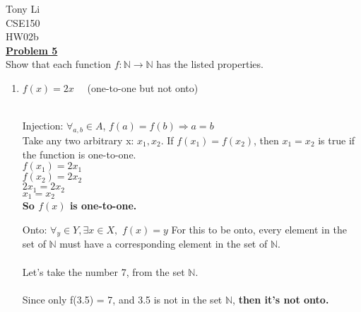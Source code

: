 \documentclass[11pt]{article}
\begin{document}
\noindent 
Tony Li \\
CSE150 \\
HW02b \\

\noindent\textbf{\underline{Problem 5}}\\
	Show that each function $f : \mathbb{N} \rightarrow \mathbb{N}$ has the listed properties.
	
	\begin{enumerate}

		\item $f(x) = 2x$ \,\,\,\,\,\,(one-to-one but not onto) \\\\
			\begin{minipage}{0.5\textwidth}
				Injection: $\forall_{a,b} \in A$, $f(a) = f(b) \Rightarrow a = b$ \\
				Take any two arbitrary x: $x_1, x_2$.
				If $f(x_1) = f(x_2)$, then $x_1 = x_2$ is true if the function is one-to-one.\\
				$f(x_1) = 2x_1$\\
				$f(x_2) = 2x_2$\\
				$2x_1 = 2x_2$\\
				$x_1 = x_2$\\
			\textbf{So $f(x)$ is one-to-one.}\\
			\end{minipage}
			\begin{minipage}{0.5\textwidth}
				Onto: $\forall_{y} \in Y, \exists x \in X,$ $f(x) = y$
				For this to be onto, every element in the set of $\mathbb{N}$ must have a corresponding element in the set of $\mathbb{N}$. \\\\
				Let's take the number 7, from the set $\mathbb{N}$. \\\\
				Since only f(3.5) = 7, and 3.5 is not in the set $\mathbb{N}$, \textbf{then it's not onto.}
			\end{minipage}\\\\


\end{enumerate}
\end{document}
